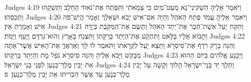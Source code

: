 Judges 4:19	וַיֹּאמֶר אֵלֶיהָ הַשְׁקִינִי־נָא מְעַט־מַיִם כִּי צָמֵאתִי וַתִּפְתַּח אֶת־נֹאוד הֶחָלָב וַתַּשְׁקֵהוּ וַתְּכַסֵּהוּ׃
Judges 4:20	וַיֹּאמֶר אֵלֶיהָ עֲמֹד פֶּתַח הָאֹהֶל וְהָיָה אִם־אִישׁ יָבֹא וּשְׁאֵלֵךְ וְאָמַר הֲיֵשׁ־פֹּה אִישׁ וְאָמַרְתְּ אָיִן׃
Judges 4:21	וַתִּקַּח יָעֵל אֵשֶׁת־חֶבֶר אֶת־יְתַד הָאֹהֶל וַתָּשֶׂם אֶת־הַמַּקֶּבֶת בְּיָדָהּ וַתָּבוֹא אֵלָיו בַּלָּאט וַתִּתְקַע אֶת־הַיָּתֵד בְּרַקָּתוֹ וַתִּצְנַח בָּאָרֶץ וְהוּא־נִרְדָּם וַיָּעַף וַיָּמֹת׃
Judges 4:22	וְהִנֵּה בָרָק רֹדֵף אֶת־סִיסְרָא וַתֵּצֵא יָעֵל לִקְרָאתוֹ וַתֹּאמֶר לוֹ לֵךְ וְאַרְאֶךָּ אֶת־הָאִישׁ אֲשֶׁר־אַתָּה מְבַקֵּשׁ וַיָּבֹא אֵלֶיהָ וְהִנֵּה סִיסְרָא נֹפֵל מֵת וְהַיָּתֵד בְּרַקָּתוֹ׃
Judges 4:23	וַיַּכְנַע אֱלֹהִים בַּיּוֹם הַהוּא אֵת יָבִין מֶלֶךְ־כְּנָעַן לִפְנֵי בְּנֵי יִשְׂרָאֵל׃
Judges 4:24	וַתֵּלֶךְ יַד בְּנֵי־יִשְׂרָאֵל הָלוֹךְ וְקָשָׁה עַל יָבִין מֶלֶךְ־כְּנָעַן עַד אֲשֶׁר הִכְרִיתוּ אֵת יָבִין מֶלֶךְ־כְּנָעַן׃ {פ}
